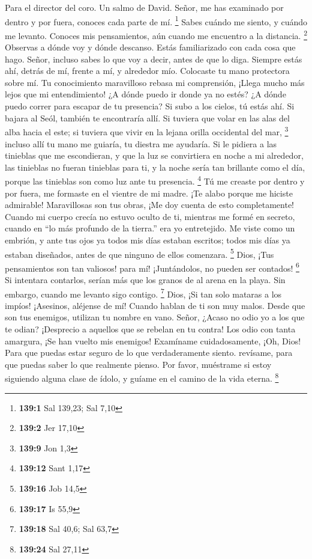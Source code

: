 Para el director del coro. Un salmo de David.  Señor, me has
examinado por dentro y por fuera, conoces cada parte de mí. \footnote{\textbf{139:1}
  Sal 139,23; Sal 7,10}  Sabes cuándo me siento, y cuándo me
levanto. Conoces mis pensamientos, aún cuando me encuentro a la
distancia. \footnote{\textbf{139:2} Jer 17,10}  Observas a
dónde voy y dónde descanso. Estás familiarizado con cada cosa que hago.
 Señor, incluso sabes lo que voy a decir, antes de que lo
diga.  Siempre estás ahí, detrás de mí, frente a mí, y
alrededor mío. Colocaste tu mano protectora sobre mí.  Tu
conocimiento maravilloso rebasa mi comprensión, ¡Llega mucho más lejos
que mi entendimiento!  ¿A dónde puedo ir donde ya no estés?
¿A dónde puedo correr para escapar de tu presencia?  Si subo
a los cielos, tú estás ahí. Si bajara al Seól, también te encontraría
allí.  Si tuviera que volar en las alas del alba hacia el
este; si tuviera que vivir en la lejana orilla occidental del mar,
\footnote{\textbf{139:9} Jon 1,3}  incluso allí tu mano me
guiaría, tu diestra me ayudaría.  Si le pidiera a las
tinieblas que me escondieran, y que la luz se convirtiera en noche a mi
alrededor,  las tinieblas no fueran tinieblas para ti, y la
noche sería tan brillante como el día, porque las tinieblas son como luz
ante tu presencia. \footnote{\textbf{139:12} Sant 1,17}  Tú
me creaste por dentro y por fuera, me formaste en el vientre de mi
madre.  ¡Te alabo porque me hiciste admirable! Maravillosas
son tus obras, ¡Me doy cuenta de esto completamente! 
Cuando mi cuerpo crecía no estuvo oculto de ti, mientras me formé en
secreto, cuando en ``lo más profundo de la tierra.'' era yo entretejido.
 Me viste como un embrión, y ante tus ojos ya todos mis
días estaban escritos; todos mis días ya estaban diseñados, antes de que
ninguno de ellos comenzara. \footnote{\textbf{139:16} Job 14,5}
 Dios, ¡Tus pensamientos son tan valiosos! para mí!
¡Juntándolos, no pueden ser contados! \footnote{\textbf{139:17} Is 55,9}
 Si intentara contarlos, serían más que los granos de al
arena en la playa. Sin embargo, cuando me levanto sigo contigo.
\footnote{\textbf{139:18} Sal 40,6; Sal 63,7}  Dios, ¡Si
tan solo mataras a los impíos! ¡Asesinos, aléjense de mí! 
Cuando hablan de ti son muy malos. Desde que son tus enemigos, utilizan
tu nombre en vano.  Señor, ¿Acaso no odio yo a los que te
odian? ¡Desprecio a aquellos que se rebelan en tu contra! 
Los odio con tanta amargura, ¡Se han vuelto mis enemigos! 
Examíname cuidadosamente, ¡Oh, Dios! Para que puedas estar seguro de lo
que verdaderamente siento. revísame, para que puedas saber lo que
realmente pienso.  Por favor, muéstrame si estoy siguiendo
alguna clase de ídolo, y guíame en el camino de la vida eterna.
\footnote{\textbf{139:24} Sal 27,11}

